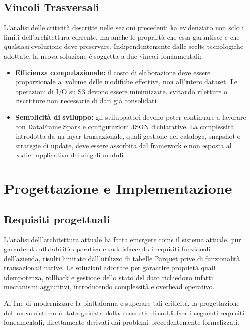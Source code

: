 \documentclass[12pt,a4paper,openright,twoside]{book}
\begin{document}
\section{Vincoli Trasversali}
\label{sec:vincoli-trasversali}
L'analisi delle criticità descritte nelle sezioni precedenti ha evidenziato non solo i limiti dell'architettura corrente, ma anche le proprietà che essa garantisce e che qualsiasi evoluzione deve preservare. Indipendentemente dalle scelte tecnologiche adottate, la nuova soluzione è soggetta a due vincoli fondamentali:

\begin{itemize}
    \item \textbf{Efficienza computazionale:} il costo di elaborazione deve essere proporzionale al volume delle modifiche effettive, non all'intero dataset. Le operazioni di I/O su S3 devono essere minimizzate, evitando riletture o riscritture non necessarie di dati già consolidati.
    \item \textbf{Semplicità di sviluppo:} gli sviluppatori devono poter continuare a lavorare con DataFrame Spark e configurazioni JSON dichiarative. La complessità introdotta da un layer transazionale, quali gestione del catalogo, snapshot o strategie di update, deve essere assorbita dal framework e non esposta al codice applicativo dei singoli moduli.
\end{itemize}

\chapter{Progettazione e Implementazione}
\label{chap:design-and-implementation}

\section{Requisiti progettuali}
L'analisi dell'architettura attuale ha fatto emergere come il sistema attuale, pur garantendo affidabilità operativa e soddisfacendo i requisiti funzionali dell'azienda,
risulti limitato dall'utilizzo di tabelle Parquet prive di funzionalità transazionali native.
Le soluzioni adottate per garantire proprietà quali idempotenza, rollback e gestione dello stato del dato richiedono infatti meccanismi aggiuntivi, introducendo complessità e overhead operativo.

Al fine di modernizzare la piattaforma e superare tali criticità, 
la progettazione del nuovo sistema è stata guidata dalla necessità di soddisfare i seguenti requisiti fondamentali, 
direttamente derivati dai problemi precedentemente formalizzati:
\end{document}
